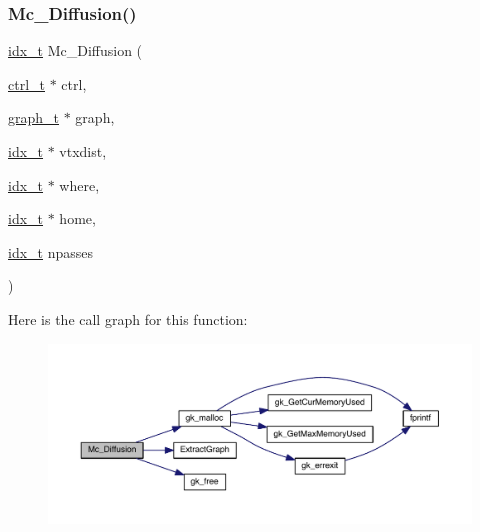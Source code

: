 \subsubsection{\texorpdfstring{Mc\+\_\+\+Diffusion()}{Mc\_Diffusion()}}
{\footnotesize\ttfamily \hyperlink{a00876_aaa5262be3e700770163401acb0150f52}{idx\+\_\+t} Mc\+\_\+\+Diffusion (\begin{DoxyParamCaption}\item[{\hyperlink{a00742}{ctrl\+\_\+t} $\ast$}]{ctrl,  }\item[{\hyperlink{a00734}{graph\+\_\+t} $\ast$}]{graph,  }\item[{\hyperlink{a00876_aaa5262be3e700770163401acb0150f52}{idx\+\_\+t} $\ast$}]{vtxdist,  }\item[{\hyperlink{a00876_aaa5262be3e700770163401acb0150f52}{idx\+\_\+t} $\ast$}]{where,  }\item[{\hyperlink{a00876_aaa5262be3e700770163401acb0150f52}{idx\+\_\+t} $\ast$}]{home,  }\item[{\hyperlink{a00876_aaa5262be3e700770163401acb0150f52}{idx\+\_\+t}}]{npasses }\end{DoxyParamCaption})}

Here is the call graph for this function\+:\nopagebreak
\begin{figure}[H]
\begin{center}
\leavevmode
\includegraphics[width=350pt]{a00371_a784a5e869479c028b824831459261587_cgraph}
\end{center}
\end{figure}
